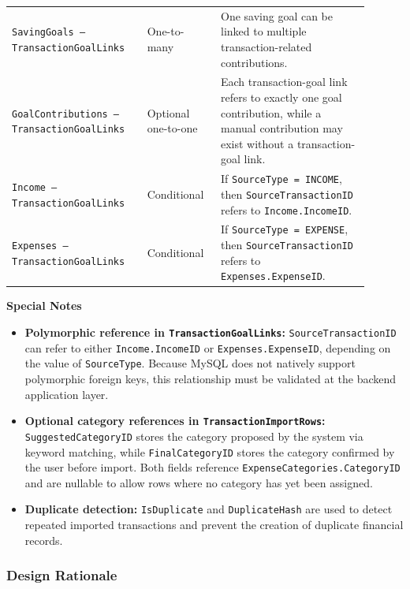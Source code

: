 \documentclass{article}
\begin{document}
\begin{longtable}{
    >{\raggedright\arraybackslash}p{0.34\linewidth}
    >{\centering\arraybackslash}p{0.18\linewidth}
    J{0.38\linewidth}
}
\texttt{SavingGoals -- TransactionGoalLinks}
& One-to-many
& One saving goal can be linked to multiple transaction-related contributions. \\

\texttt{GoalContributions -- TransactionGoalLinks}
& Optional one-to-one
& Each transaction-goal link refers to exactly one goal contribution, while a manual contribution may exist without a transaction-goal link. \\

\texttt{Income -- TransactionGoalLinks}
& Conditional
& If \texttt{SourceType = INCOME}, then \texttt{SourceTransactionID} refers to \texttt{Income.IncomeID}. \\

\texttt{Expenses -- TransactionGoalLinks}
& Conditional
& If \texttt{SourceType = EXPENSE}, then \texttt{SourceTransactionID} refers to \texttt{Expenses.ExpenseID}. \\

\end{longtable}

\textbf{Special Notes}

\begin{itemize}
    \item \textbf{Polymorphic reference in \texttt{TransactionGoalLinks}:}
    \texttt{SourceTransactionID} can refer to either \texttt{Income.IncomeID} or
    \texttt{Expenses.ExpenseID}, depending on the value of \texttt{SourceType}.
    Because MySQL does not natively support polymorphic foreign keys, this relationship
    must be validated at the backend application layer.

    \item \textbf{Optional category references in \texttt{TransactionImportRows}:}
    \texttt{SuggestedCategoryID} stores the category proposed by the system via keyword
    matching, while \texttt{FinalCategoryID} stores the category confirmed by the user
    before import. Both fields reference \texttt{ExpenseCategories.CategoryID} and are
    nullable to allow rows where no category has yet been assigned.

    \item \textbf{Duplicate detection:}
    \texttt{IsDuplicate} and \texttt{DuplicateHash} are used to detect repeated imported
    transactions and prevent the creation of duplicate financial records.
\end{itemize}

\subsubsection{Design Rationale}
\end{document}
